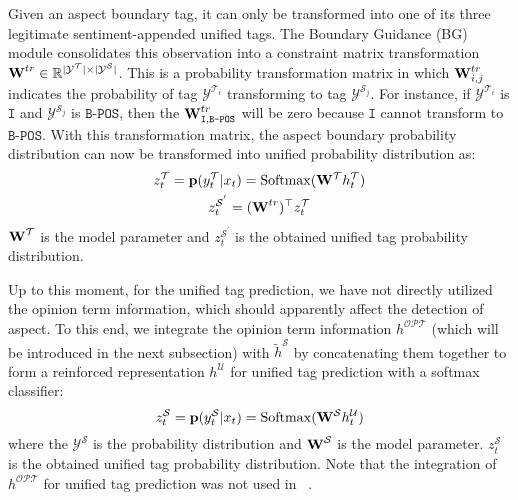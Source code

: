 \documentclass[letterpaper]{article} \usepackage{aaai20}  \usepackage{times}  \usepackage{helvet} \usepackage{courier}  \usepackage[hyphens]{url}  \usepackage{graphicx} \urlstyle{rm} \def\UrlFont{\rm}  \usepackage{graphicx}  \frenchspacing  \setlength{\pdfpagewidth}{8.5in}  \setlength{\pdfpageheight}{11in}
\newcommand{\citet}[1]
{\citeauthor{#1}~\shortcite{#1}}
\begin{document}
Given an aspect boundary tag, it can only be transformed into one of its three legitimate sentiment-appended unified tags. The Boundary Guidance (BG) module consolidates this observation into a constraint matrix transformation $\text{\bf W}^{tr} \in \mathbb{R}^{|\mathcal{Y}^{\mathcal{T}}| \times |\mathcal{Y}^{\mathcal{S}}|}$. This is a probability transformation matrix in which $\text{\bf W}^{tr}_{i,j}$ indicates the probability of tag $\mathcal{Y}^{\mathcal{T}_{i}}$ transforming to tag $\mathcal{Y}^{\mathcal{S}_{j}}$. For instance, if $\mathcal{Y}^{\mathcal{T}_{i}}$ is $\texttt{I}$ and $\mathcal{Y}^{\mathcal{S}_{j}}$ is $\texttt{B-POS}$, then the $\text{\bf W}^{tr}_{\texttt{I},\texttt{B-POS}}$ will be zero because $\texttt{I}$ cannot transform to $\texttt{B-POS}$. With this transformation matrix, the aspect boundary probability distribution can now be transformed into unified probability distribution as:
\begin{equation}
\begin{gathered}
    z^{\mathcal{T}}_t = {\bf p}(y^{\mathcal{T}}_t|x_t) = \mathrm{Softmax}(\mathrm{\bf W}^{\mathcal{T}} h^{\mathcal{T}}_t)\\
    z^{\mathcal{S}^{'}}_t = (\text{\bf W}^{tr})^{\top}z^{\mathcal{T}}_t
\end{gathered}
\end{equation} 
$\text{\bf W}^{\mathcal{T}}$ is the model parameter and $z^{\mathcal{S}^{'}}_t$ is the obtained unified tag probability distribution.


Up to this moment, for the unified tag prediction, we have not directly utilized the opinion term information, which should apparently affect the detection of aspect. To this end, we integrate the opinion term information ${h}^{\mathcal{OPT}}$ (which will be introduced in the next subsection) with $\tilde{h}^{\mathcal{S}}$  by concatenating them together to form a reinforced representation ${h}^{\mathcal{U}}$ for unified tag prediction with a softmax classifier:
\begin{equation}\label{eq3}
    z^{\mathcal{S}}_t = {\bf p}(y^{\mathcal{S}}_t|x_t) = \mathrm{Softmax}(\mathrm{\bf W}^{\mathcal{S}} h^{\mathcal{U}}_t)
\end{equation}
where the $\mathcal{Y}^{\mathcal{S}}$ is the probability distribution and $\text{\bf W}^{\mathcal{S}}$ is the model parameter. $z^{\mathcal{S}}_t$ is the obtained unified tag probability distribution. Note that the integration of ${h}^{\mathcal{OPT}}$ for unified tag prediction was not used in \citet{li2019unified}.
\end{document}
